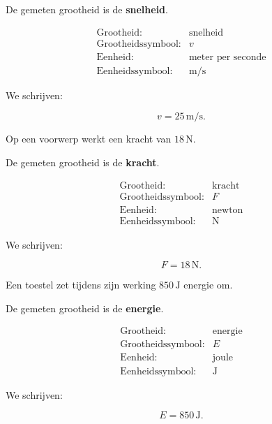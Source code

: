 \documentclass{ximera}
\begin{document}
\begin{oefening}{\oefB\ESS}
\begin{question}
\begin{oplossing}
De gemeten grootheid is de \textbf{snelheid}.

\[
\begin{array}{ll}
\text{Grootheid:} & \text{snelheid} \\
\text{Grootheidssymbool:} & v \\
\text{Eenheid:} & \text{meter per seconde} \\
\text{Eenheidssymbool:} & \mathrm{m/s}
\end{array}
\]

We schrijven:

\[
v = 25\,\mathrm{m/s}.
\]
\end{oplossing}
\end{question}


\begin{question}
Op een voorwerp werkt een kracht van $18\,\mathrm{N}$.

\begin{oplossing}
De gemeten grootheid is de \textbf{kracht}.

\[
\begin{array}{ll}
\text{Grootheid:} & \text{kracht} \\
\text{Grootheidssymbool:} & F \\
\text{Eenheid:} & \text{newton} \\
\text{Eenheidssymbool:} & \mathrm{N}
\end{array}
\]

We schrijven:

\[
F = 18\,\mathrm{N}.
\]
\end{oplossing}
\end{question}


\begin{question}
Een toestel zet tijdens zijn werking $850\,\mathrm{J}$ energie om.

\begin{oplossing}
De gemeten grootheid is de \textbf{energie}.

\[
\begin{array}{ll}
\text{Grootheid:} & \text{energie} \\
\text{Grootheidssymbool:} & E \\
\text{Eenheid:} & \text{joule} \\
\text{Eenheidssymbool:} & \mathrm{J}
\end{array}
\]

We schrijven:

\[
E = 850\,\mathrm{J}.
\]
\end{oplossing}
\end{question}



\end{oefening}
\end{document}
